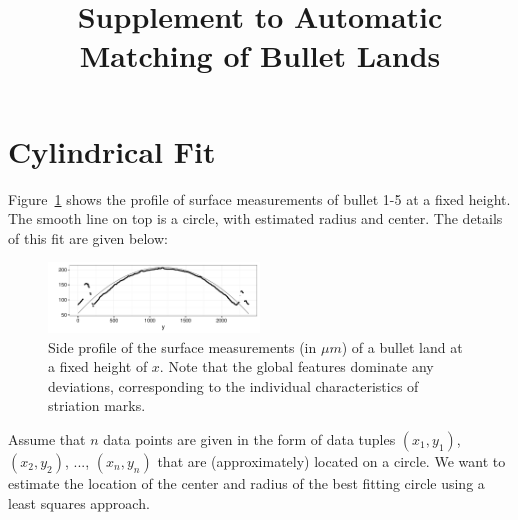 \documentclass[aoas]{imsart}\usepackage[]{graphicx}\usepackage[]{color}
\newenvironment{knitrout}{}{} %
\begin{document}
\begin{frontmatter}

\title{Supplement to Automatic Matching of Bullet Lands}


\end{frontmatter}

\linenumbers
\tableofcontents
\newpage


\section{Cylindrical Fit}\label{supp:cylindrical}
Figure~\ref{fig:fixedX} shows the  profile of surface measurements of bullet 1-5 at a fixed height. The smooth line on top is a circle, with estimated radius and center. The details of this fit are given below:
%
\begin{figure}[hbtp]
  \centering
\begin{knitrout}
\color{fgcolor}
\includegraphics[width=0.5\textwidth]{fixedX-1} 

\end{knitrout}
\caption{\label{fig:fixedX}Side profile of the surface measurements (in $\mu m$) of a bullet land at a fixed height of $x$. Note that the global features dominate any deviations, corresponding to the individual characteristics of striation marks.}
\end{figure}


Assume that $n$ data points are given in the form of data tuples $(x_1, y_1)$, $(x_2, y_2)$, $...$, $(x_n, y_n)$ that are (approximately) located on a circle. We want to estimate the location of the center and radius of the best fitting circle using a least squares approach.
\end{document}
